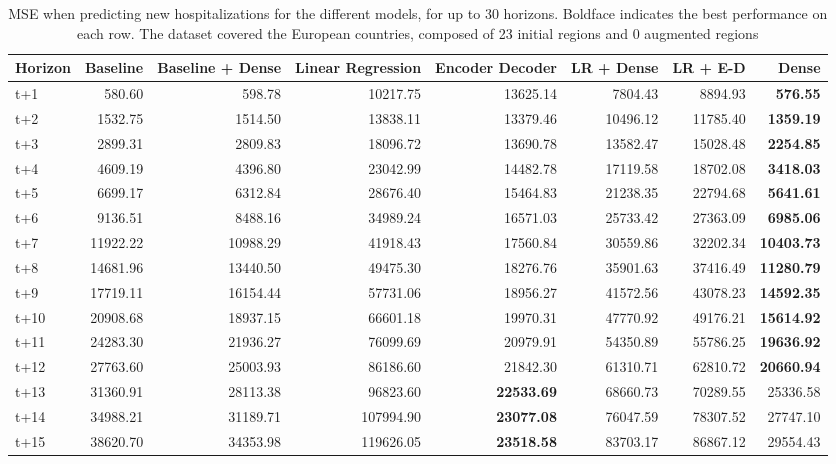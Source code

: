 \begin{table}[H]
\centering
\caption{MSE when predicting new hospitalizations for the different models, for up to 30 horizons. Boldface indicates the best performance on each row. The dataset covered the European countries, composed of 23 initial regions and 0 augmented regions }
\label{tab:MSE_comparison}
\begin{tabular}{lrrrrrrr}
\toprule
Horizon &  Baseline &  Baseline + Dense &  Linear Regression &  Encoder Decoder &  LR + Dense &  LR + E-D &    Dense \\
\midrule
t+1  & 580.60  & 598.78  & 10217.75  & 13625.14  & 7804.43  & 8894.93  & \textbf{576.55}  \\
t+2  & 1532.75  & 1514.50  & 13838.11  & 13379.46  & 10496.12  & 11785.40  & \textbf{1359.19}  \\
t+3  & 2899.31  & 2809.83  & 18096.72  & 13690.78  & 13582.47  & 15028.48  & \textbf{2254.85}  \\
t+4  & 4609.19  & 4396.80  & 23042.99  & 14482.78  & 17119.58  & 18702.08  & \textbf{3418.03}  \\
t+5  & 6699.17  & 6312.84  & 28676.40  & 15464.83  & 21238.35  & 22794.68  & \textbf{5641.61}  \\
t+6  & 9136.51  & 8488.16  & 34989.24  & 16571.03  & 25733.42  & 27363.09  & \textbf{6985.06}  \\
t+7  & 11922.22  & 10988.29  & 41918.43  & 17560.84  & 30559.86  & 32202.34  & \textbf{10403.73}  \\
t+8  & 14681.96  & 13440.50  & 49475.30  & 18276.76  & 35901.63  & 37416.49  & \textbf{11280.79}  \\
t+9  & 17719.11  & 16154.44  & 57731.06  & 18956.27  & 41572.56  & 43078.23  & \textbf{14592.35}  \\
t+10  & 20908.68  & 18937.15  & 66601.18  & 19970.31  & 47770.92  & 49176.21  & \textbf{15614.92}  \\
t+11  & 24283.30  & 21936.27  & 76099.69  & 20979.91  & 54350.89  & 55786.25  & \textbf{19636.92}  \\
t+12  & 27763.60  & 25003.93  & 86186.60  & 21842.30  & 61310.71  & 62810.72  & \textbf{20660.94}  \\
t+13  & 31360.91  & 28113.38  & 96823.60  & \textbf{22533.69}  & 68660.73  & 70289.55  & 25336.58  \\
t+14  & 34988.21  & 31189.71  & 107994.90  & \textbf{23077.08}  & 76047.59  & 78307.52  & 27747.10  \\
t+15  & 38620.70  & 34353.98  & 119626.05  & \textbf{23518.58}  & 83703.17  & 86867.12  & 29554.43  \\

\end{tabular}
\end{table}
